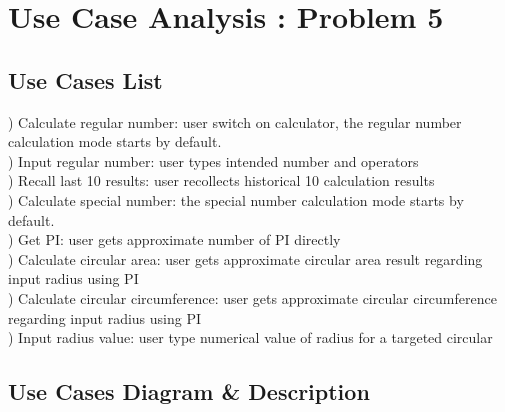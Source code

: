 \chapter{Use Case Analysis : Problem 5}
\vspace{8pt}

\section{Use Cases List}

\begin{flushleft}

\vspace{5pt}
)	Calculate regular number: user switch on calculator, the regular number calculation mode starts by default.
\vspace{4pt}
\leavevmode\\
)	Input regular number: user types intended number and operators
\vspace{4pt}
\leavevmode\\
)	Recall last 10 results: user recollects historical 10 calculation results
\vspace{4pt}
\leavevmode\\
)	Calculate special number: the special number calculation mode starts by default.
\vspace{4pt}
\leavevmode\\
)	Get PI: user gets approximate number of PI directly
\vspace{4pt}
\leavevmode\\
)	Calculate circular area: user gets approximate circular area result regarding input radius using PI
\vspace{4pt}
\leavevmode\\
)	Calculate circular circumference: user gets approximate circular circumference regarding input radius using PI
\vspace{4pt}
\leavevmode\\
)	Input radius value: user type numerical value of radius for a targeted circular
\leavevmode\\

\end{flushleft}

\section{Use Cases Diagram & Description}

